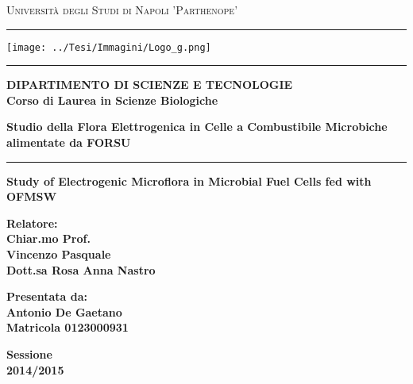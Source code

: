 \documentclass[12pt,a4paper]{report}
\begin{document}
\begin{titlepage}
\begin{center}
{{\Large{\textsc{Università degli
Studi di Napoli 'Parthenope'}}}} \rule[0.1cm]{15.8cm}{0.1mm}
\texttt{[image: ../Tesi/Immagini/Logo\_g.png]} 
\rule[0.5cm]{15.8cm}{0.6mm}
{\small{\bf DIPARTIMENTO DI SCIENZE E TECNOLOGIE\\Corso di Laurea in Scienze Biologiche }}
\end{center}
\vspace{15mm}
\begin{center}
{\Large{\bf Studio della Flora Elettrogenica in Celle a Combustibile Microbiche alimentate da FORSU}}\\
\vspace{1.5mm}
\rule[0.1cm]{15.8cm}{0.1mm}
\vspace{1.5mm}
{\Large{\bf Study of Electrogenic Microflora in Microbial Fuel Cells fed with OFMSW}}\\

\end{center}
\vspace{40mm}
\par
\noindent
\begin{minipage}[t]{0.47\textwidth}
{\large{\bf Relatore:\\
Chiar.mo Prof.\\
Vincenzo Pasquale\\
Dott.sa Rosa Anna Nastro}}
\end{minipage}
\hfill
\begin{minipage}[t]{0.47\textwidth}\raggedleft
{\large{\bf Presentata da:\\
Antonio De Gaetano\\
Matricola 0123000931}}
\end{minipage}
\vspace{20mm}
\begin{center}
{\large{\bf Sessione\\%
2014/2015 }}%
\end{center}
\end{titlepage}
\end{document}
